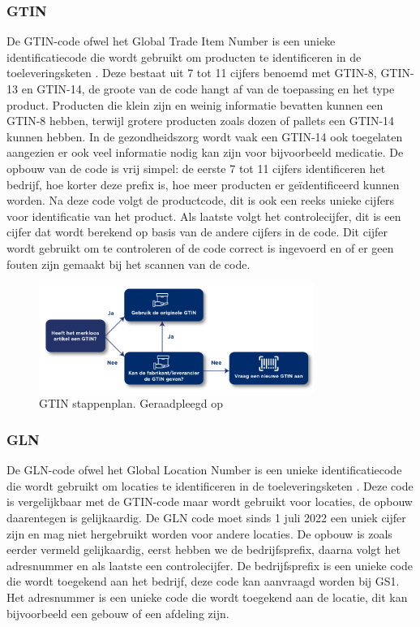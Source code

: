 \subsubsection{GTIN}
De GTIN-code ofwel het Global Trade Item Number is een unieke identificatiecode die wordt gebruikt om producten te identificeren in de toeleveringsketen \autocite{GTIN2025}.
Deze bestaat uit 7 tot 11 cijfers benoemd met GTIN-8, GTIN-13 en GTIN-14, de groote van de code hangt af van de toepassing en het type product.
Producten die klein zijn en weinig informatie bevatten kunnen een GTIN-8 hebben, terwijl grotere producten zoals dozen of pallets een GTIN-14 kunnen hebben.
In de gezondheidszorg wordt vaak een GTIN-14 ook toegelaten aangezien er ook veel informatie nodig kan zijn voor bijvoorbeeld medicatie.
De opbouw van de code is vrij simpel: de eerste 7 tot 11 cijfers identificeren het bedrijf, hoe korter deze prefix is, hoe meer producten er geïdentificeerd kunnen worden.
Na deze code volgt de productcode, dit is ook een reeks unieke cijfers voor identificatie van het product.
Als laatste volgt het controlecijfer, dit is een cijfer dat wordt berekend op basis van de andere cijfers in de code.
Dit cijfer wordt gebruikt om te controleren of de code correct is ingevoerd en of er geen fouten zijn gemaakt bij het scannen van de code.

\begin{figure}[H]
     \centering
     \includegraphics[width=0.8\textwidth]{./img/GTIN.png}
     \caption[GTIN stappenplan]{\label{fig:gtin} GTIN stappenplan. Geraadpleegd op~\cite{GTIN2025} }
\end{figure}

\subsubsection{GLN}
De GLN-code ofwel het Global Location Number is een unieke identificatiecode die wordt gebruikt om locaties te identificeren in de toeleveringsketen \autocite{GLN}.
Deze code is vergelijkbaar met de GTIN-code maar wordt gebruikt voor locaties, de opbouw daarentegen is gelijkaardig.
De GLN code moet sinds 1 juli 2022 een uniek cijfer zijn en mag niet hergebruikt worden voor andere locaties.
De opbouw is zoals eerder vermeld gelijkaardig, eerst hebben we de bedrijfsprefix, daarna volgt het adresnummer en als laatste een controlecijfer.
De bedrijfsprefix is een unieke code die wordt toegekend aan het bedrijf, deze code kan aanvraagd worden bij GS1. Het adresnummer is een unieke code die wordt toegekend aan de locatie, dit kan bijvoorbeeld een gebouw of een afdeling zijn.

